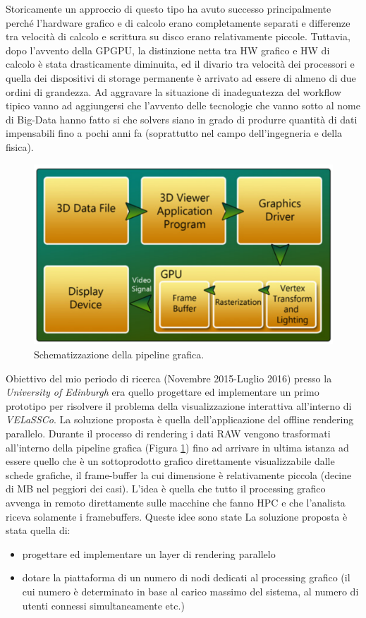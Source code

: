 Storicamente un approccio di questo tipo ha avuto successo principalmente perché l'hardware grafico e di calcolo erano completamente separati e differenze tra velocità di calcolo e scrittura su disco erano relativamente piccole.
Tuttavia, dopo l'avvento della GPGPU, la distinzione netta tra HW grafico e
HW di calcolo è stata drasticamente diminuita, ed il divario tra velocità dei processori e quella dei dispositivi di storage permanente è arrivato ad essere di almeno di due ordini di grandezza.
Ad aggravare la situazione di inadeguatezza del workflow tipico vanno ad aggiungersi che l'avvento delle tecnologie che vanno sotto al nome di Big-Data  hanno fatto si che solvers siano in grado di produrre quantità di dati impensabili fino a pochi anni fa (soprattutto nel campo dell'ingegneria e della fisica). 
\begin{figure}[!htbp]
	\centering
	\includegraphics[scale=0.3]{images/pipeline}
	\caption{Schematizzazione della pipeline grafica.}
	\label{fig:pip}
\end{figure}
Obiettivo del mio periodo di ricerca (Novembre 2015-Luglio 2016) presso la \textit{University of Edinburgh} era quello progettare ed implementare un primo prototipo per risolvere il problema della visualizzazione interattiva all'interno di \textit{VELaSSCo}. La soluzione proposta è  quella dell'applicazione del offline rendering parallelo.
Durante il processo di rendering i dati RAW vengono trasformati  all'interno della pipeline grafica (Figura \ref{fig:pip}) fino ad arrivare in ultima istanza ad essere quello che è un sottoprodotto grafico direttamente visualizzabile dalle schede grafiche, il frame-buffer la cui  dimensione è relativamente piccola (decine di MB nel peggiori dei casi).
L'idea è quella che tutto il processing grafico avvenga in remoto direttamente sulle macchine che fanno HPC e che l'analista riceva solamente i framebuffers.
Queste idee sono state
La soluzione proposta è stata quella di:
\begin{itemize}
	\item progettare ed implementare un layer di rendering parallelo
	\item dotare la piattaforma di un numero di nodi dedicati al processing grafico (il cui numero è determinato in base al carico massimo del sistema, al numero di utenti connessi simultaneamente etc.)
	
\end{itemize}

